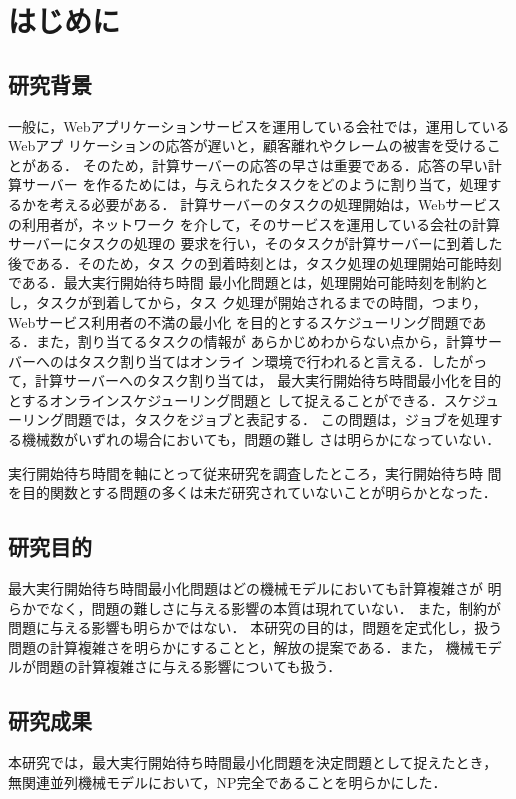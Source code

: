 \documentclass[12pt]{optlab-bachelor}
\begin{document}
\frontmatter

\chapter{はじめに}
\section{研究背景}
一般に，Webアプリケーションサービスを運用している会社では，運用しているWebアプ
リケーションの応答が遅いと，顧客離れやクレームの被害を受けることがある．
そのため，計算サーバーの応答の早さは重要である．応答の早い計算サーバー
を作るためには，与えられたタスクをどのように割り当て，処理するかを考える必要がある．
計算サーバーのタスクの処理開始は，Webサービスの利用者が，ネットワーク
を介して，そのサービスを運用している会社の計算サーバーにタスクの処理の
要求を行い，そのタスクが計算サーバーに到着した後である．そのため，タス
クの到着時刻とは，タスク処理の処理開始可能時刻である．最大実行開始待ち時間
最小化問題とは，処理開始可能時刻を制約とし，タスクが到着してから，タス
ク処理が開始されるまでの時間，つまり，Webサービス利用者の不満の最小化
を目的とするスケジューリング問題である．また，割り当てるタスクの情報が
あらかじめわからない点から，計算サーバーへのはタスク割り当てはオンライ
ン環境で行われると言える．したがって，計算サーバーへのタスク割り当ては，
最大実行開始待ち時間最小化を目的とするオンラインスケジューリング問題と
して捉えることができる．スケジューリング問題では，タスクをジョブと表記する．
この問題は，ジョブを処理する機械数がいずれの場合においても，問題の難し
さは明らかになっていない．

実行開始待ち時間を軸にとって従来研究を調査したところ，実行開始待ち時
間を目的関数とする問題の多くは未だ研究されていないことが明らかとなった．

\section{研究目的}
最大実行開始待ち時間最小化問題はどの機械モデルにおいても計算複雑さが
明らかでなく，問題の難しさに与える影響の本質は現れていない．
また，制約が問題に与える影響も明らかではない．
本研究の目的は，問題を定式化し，扱う問題の計算複雑さを明らかにすることと，解放の提案である．また，
機械モデルが問題の計算複雑さに与える影響についても扱う．

\section{研究成果}
本研究では，最大実行開始待ち時間最小化問題を決定問題として捉えたとき，
無関連並列機械モデルにおいて，NP完全であることを明らかにした．
\end{document}
